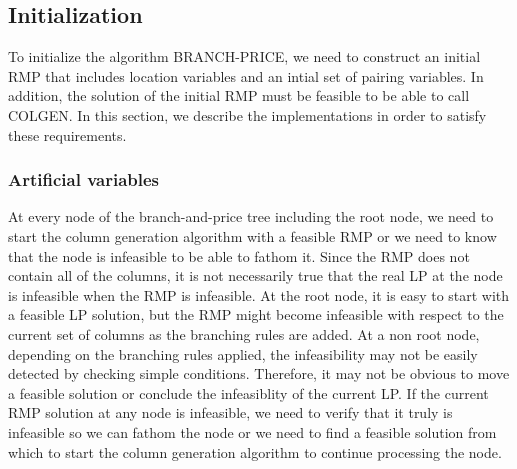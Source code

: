 \subsection{Initialization}

To initialize the algorithm BRANCH-PRICE, we need to construct an initial RMP that 
includes location variables and an intial set of pairing variables. In addition,
the solution of the initial RMP  must be feasible to be able to call COLGEN.  
In this section, we describe the implementations in order to satisfy these
requirements. 

\subsubsection{Artificial variables} 
At every node of the branch-and-price tree including the root node, we need to start 
the column generation algorithm with a feasible RMP or we need to know that the 
node is infeasible to be able to fathom it. Since the RMP does not contain all of the columns,
it is not necessarily true that the real LP at the  node is infeasible when the RMP is 
infeasible. At the root node, it is easy to start with a feasible LP solution, but the 
RMP might become infeasible with respect to the current set of columns as the branching
rules are added. At a non root node, depending on the branching rules applied, the 
infeasibility may not be easily detected by checking simple conditions. Therefore,
it may not be obvious to move a feasible solution or conclude the 
infeasiblity of the current LP. If the current RMP solution at any node is infeasible, 
we need to verify that it truly is infeasible so we can fathom the node or we need to find a 
feasible solution from which to start the column generation algorithm to continue processing
the node.    




